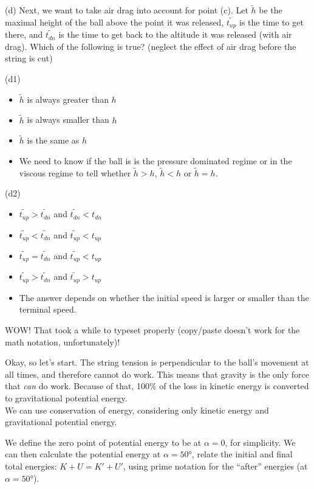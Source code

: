 \documentclass[8.01x]{subfiles}
\begin{document}
(d) Next, we want to take air drag into account for point (c). Let $\widetilde{h}$ be the maximal height of the ball above the point it was released, $\widetilde{t_{up}}$ is the time to get there, and $\widetilde{t_{dn}}$ is the time to get back to the altitude it was released (with air drag). Which of the following is true? (neglect the effect of air drag before the string is cut)

(d1)

\begin{itemize}
\item $\widetilde{h}$ is always greater than $h$
\item $\widetilde{h}$ is always smaller than $h$
\item $\widetilde{h}$ is the same as $h$
\item We need to know if the ball is is the pressure dominated regime or in the viscous regime to tell whether $\widetilde{h} > h$, $\widetilde{h} < h$ or $\widetilde{h} = h$.
\end{itemize}

(d2)
\begin{itemize}
\item $\widetilde{t_{up}} > \widetilde{t_{dn}}$ and $\widetilde{t_{dn}} < t_{dn}$
\item $\widetilde{t_{up}} < \widetilde{t_{dn}}$ and $\widetilde{t_{up}} < t_{up}$
\item $\widetilde{t_{up}} = \widetilde{t_{dn}}$ and $\widetilde{t_{up}} < t_{up}$
\item $\widetilde{t_{up}} > \widetilde{t_{dn}}$ and $\widetilde{t_{up}} > t_{up}$
\item The answer depends on whether the initial speed is larger or smaller than the terminal speed.
\end{itemize}

WOW! That took a while to typeset properly (copy/paste doesn't work for the math notation, unfortunately)!

Okay, so let's start. The string tension is perpendicular to the ball's movement at all times, and therefore cannot do work. This means that gravity is the only force that \emph{can} do work. Because of that, 100\% of the loss in kinetic energy is converted to gravitational potential energy.\\
We can use conservation of energy, considering only kinetic energy and gravitational potential energy.

We define the zero point of potential energy to be at $\alpha = 0$, for simplicity. We can then calculate the potential energy at $\alpha = \ang{50}$, relate the initial and final total energies: $K + U = K' + U'$, using prime notation for the ``after'' energies (at $\alpha = \ang{50}$).
\end{document}
